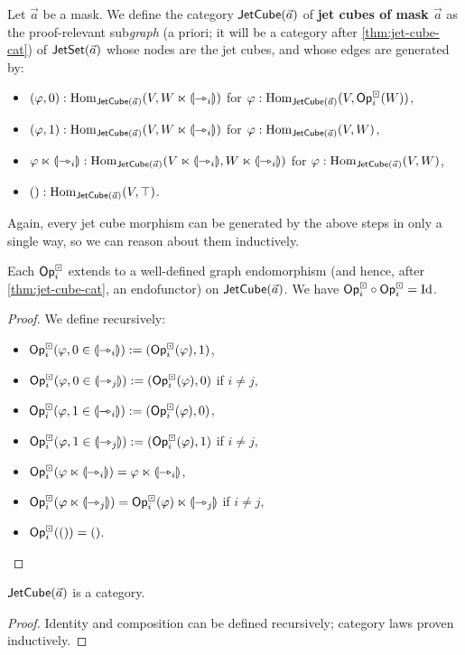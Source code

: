 \documentclass[a4paper]{article}
\begin{document}
\begin{definition} \label{def:jet-cube-cat}
	Let $\vec a$ be a mask.
	We define the category $\jetcube{\vec a}$ of \textbf{jet cubes of mask $\vec a$} as the proof-relevant sub\emph{graph} (a priori; it will be a category after \cref{thm:jet-cube-cat}) of $\jetset{\vec a}$ whose nodes are the jet cubes, and whose edges are generated by:
	\begin{itemize}
		\item $(\vfi, 0) : \Hom_{\jetcube{\vec a}}(V, W \multip \rival{\jet_i})$ for $\vfi : \Hom_{\jetcube{\vec a}}(V, \Opcube_i(W))$,
		\item $(\vfi, 1) : \Hom_{\jetcube{\vec a}}(V, W \multip \rival{\jet_i})$ for $\vfi : \Hom_{\jetcube{\vec a}}(V, W)$,
		\item $\vfi \multip \rival{\jet_i} : \Hom_{\jetcube{\vec a}}(V \multip \rival{\jet_i}, W \multip \rival{\jet_i})$ for $\vfi : \Hom_{\jetcube{\vec a}}(V, W)$,
		\item $() : \Hom_{\jetcube{\vec a}}(V, \top)$.
	\end{itemize}
\end{definition}
Again, every jet cube morphism can be generated by the above steps in only a single way, so we can reason about them inductively.
\begin{corollary} \label{thm:jet-cube-op-ftr}
	Each $\Opcube_i$ extends to a well-defined graph endomorphism (and hence, after \cref{thm:jet-cube-cat}, an endofunctor) on $\jetcube{\vec a}$.
	We have $\Opcube_i \circ \Opcube_i = \Id$.
\end{corollary}
\begin{proof}
	We define recursively:
	\begin{itemize}
		\item $\Opcube_i(\vfi, 0 \in \rival{\jet_i}) := (\Opcube_i(\vfi), 1)$,
		\item $\Opcube_i(\vfi, 0 \in \rival{\jet_j}) := (\Opcube_i(\vfi), 0)$ if $i \neq j$,
		\item $\Opcube_i(\vfi, 1 \in \rival{\jet_i}) := (\Opcube_i(\vfi), 0)$,
		\item $\Opcube_i(\vfi, 1 \in \rival{\jet_j}) := (\Opcube_i(\vfi), 1)$ if $i \neq j$,
		\item $\Opcube_i(\vfi \multip \rival{\jet_i}) = \vfi \multip \rival{\jet_i}$,
		\item $\Opcube_i(\vfi \multip \rival{\jet_j}) = \Opcube_i(\vfi) \multip \rival{\jet_j}$ if $i \neq j$,
		\item $\Opcube_i(()) = ()$. \qedhere
	\end{itemize}
\end{proof}
\begin{corollary} \label{thm:jet-cube-cat}
	$\jetcube{\vec a}$ is a category.
\end{corollary}
\begin{proof}
	Identity and composition can be defined recursively; category laws proven inductively.
\end{proof}
\end{document}
